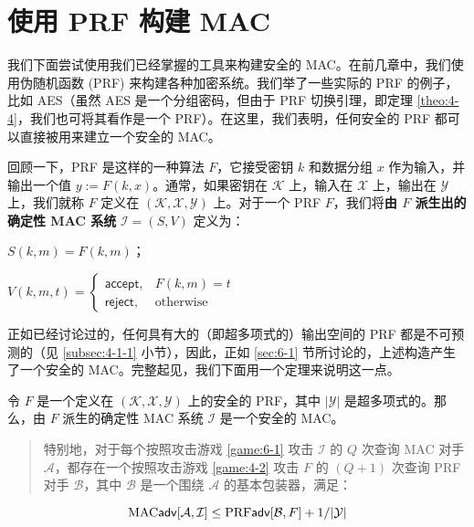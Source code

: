 \section{使用 PRF 构建 MAC}\label{sec:6-3}

我们下面尝试使用我们已经掌握的工具来构建安全的 MAC。在前几章中，我们使用伪随机函数 (PRF) 来构建各种加密系统。我们举了一些实际的 PRF 的例子，比如 AES（虽然 AES 是一个分组密码，但由于 PRF 切换引理，即定理 \ref{theo:4-4}，我们也可将其看作是一个 PRF）。在这里，我们表明，任何安全的 PRF 都可以直接被用来建立一个安全的 MAC。

回顾一下，PRF 是这样的一种算法 $F$，它接受密钥 $k$ 和数据分组 $x$ 作为输入，并输出一个值 $y:=F(k,x)$。通常，如果密钥在 $\mathcal{K}$ 上，输入在 $\mathcal{X}$ 上，输出在 $\mathcal{Y}$ 上，我们就称 $F$ 定义在 $(\mathcal{K},\mathcal{X},\mathcal{Y})$ 上。对于一个 PRF $F$，我们将\textbf{由 $F$ 派生出的确定性 MAC 系统} $\mathcal{I}=(S,V)$ 定义为：

\vspace{5pt}

\hspace*{5pt} $S(k,m)=F(k,m)$；

\vspace{5pt}

\hspace*{5pt} $
V(k,m,t)=\left\{
\begin{array}{ll}
\mathsf{accept}, & F(k,m)=t\\
\mathsf{reject}, & \text{otherwise}
\end{array}
\right.
$

\vspace{8pt}

正如已经讨论过的，任何具有大的（即超多项式的）输出空间的 PRF 都是不可预测的（见 \ref{subsec:4-1-1} 小节），因此，正如 \ref{sec:6-1} 节所讨论的，上述构造产生了一个安全的 MAC。完整起见，我们下面用一个定理来说明这一点。

\begin{theorem}\label{theo:6-2}
令 $F$ 是一个定义在 $(\mathcal{K},\mathcal{X},\mathcal{Y})$ 上的安全的 PRF，其中 $|\mathcal{Y}|$ 是超多项式的。那么，由 $F$ 派生的确定性 MAC 系统 $\mathcal{I}$ 是一个安全的 MAC。
\begin{quote}
特别地，对于每个按照攻击游戏 \ref{game:6-1} 攻击 $\mathcal{I}$ 的 $Q$ 次查询 MAC 对手 $\mathcal{A}$，都存在一个按照攻击游戏 \ref{game:4-2} 攻击 $F$ 的 $(Q+1)$ 次查询 PRF 对手 $\mathcal{B}$，其中 $\mathcal{B}$ 是一个围绕 $\mathcal{A}$ 的基本包装器，满足：
\end{quote}
\[
{\rm MAC}\mathsf{adv}[\mathcal{A},\mathcal{I}]\leq{\rm PRF\mathsf{adv}}[\mathcal{B}, F]+{1}/{|\mathcal{Y}|}
\]
\end{theorem}

